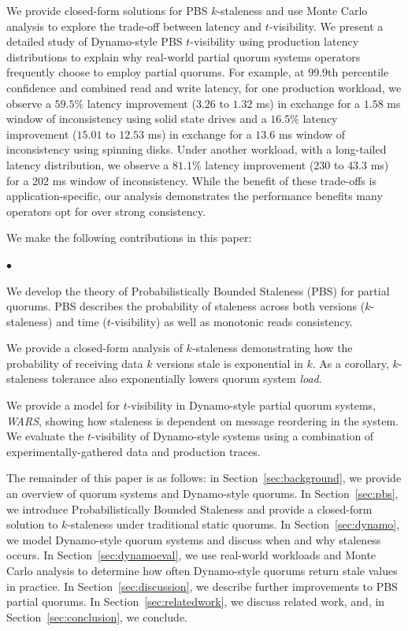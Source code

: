 \documentclass{vldb}
\newenvironment{myitemize}
{
   \vspace{-.5em}
    \begin{list}{$\bullet$ }{}
        \setlength{\topsep}{0pt}
        \setlength{\parskip}{0pt}
        \setlength{\partopsep}{0pt}
        \setlength{\parsep}{0pt}         
        \setlength{\itemsep}{.5em} 
}
{
    \end{list} 
    \vspace{-.5em}
}
\begin{document}
We provide closed-form solutions for PBS $k$-staleness and use Monte
Carlo analysis to explore the trade-off between latency and
$t$-visibility.  We present a detailed study of Dynamo-style PBS
$t$-visibility using production latency distributions to explain why
real-world partial quorum systems operators frequently choose to
employ partial quorums. For example, at $99.9$th percentile confidence
and combined read and write latency, for one production workload, we
observe a $59.5\%$ latency improvement ($3.26$ to $1.32$ ms) in
exchange for a $1.58$ ms window of inconsistency using solid state
drives and a $16.5\%$ latency improvement ($15.01$ to $12.53$ ms) in
exchange for a $13.6$ ms window of inconsistency using spinning disks.
Under another workload, with a long-tailed latency distribution, we
observe a $81.1\%$ latency improvement ($230$ to $43.3$ ms) for a
$202$ ms window of inconsistency.  While the benefit of these
trade-offs is application-specific, our analysis demonstrates the
performance benefits many operators opt for over strong consistency.

We make the following contributions in this paper:

\begin{myitemize}

\item We develop the theory of Probabilistically Bounded Staleness
  (PBS) for partial quorums. PBS describes the probability of
  staleness across both versions ($k$-staleness) and time
  ($t$-visibility) as well as monotonic reads consistency.

\item We provide a closed-form analysis of $k$-staleness demonstrating
  how the probability of receiving data $k$ versions stale is
  exponential in $k$.  As a corollary, $k$-staleness tolerance also
  exponentially lowers quorum system \textit{load}.

\item We provide a model for $t$-visibility in
  Dynamo-style partial quorum systems, \textit{WARS},  showing how
  staleness is dependent on message reordering in the system.  We
  evaluate the $t$-visibility of Dynamo-style systems using a
  combination of experimentally-gathered data and production traces.

\end{myitemize}

The remainder of this paper is as follows: in
Section~\ref{sec:background}, we provide an overview of quorum systems
and Dynamo-style quorums.  In Section~\ref{sec:pbs}, we introduce
Probabilistically Bounded Staleness and provide a closed-form solution
to $k$-staleness under traditional static quorums.  In
Section~\ref{sec:dynamo}, we model Dynamo-style quorum systems and
discuss when and why staleness occurs.  In Section~\ref{sec:dynamoeval}, we
use real-world workloads and Monte Carlo analysis to determine how
often Dynamo-style quorums return stale values in practice.  In
Section~\ref{sec:discussion}, we describe further improvements to
PBS partial quorums. In Section~\ref{sec:relatedwork}, we discuss
related work, and, in Section~\ref{sec:conclusion}, we conclude.
\end{document}
